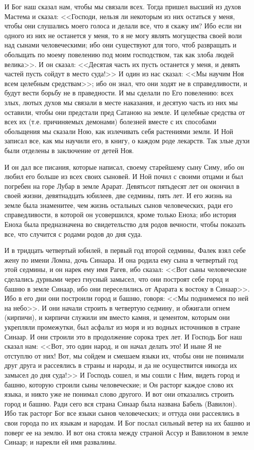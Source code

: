 И Бог наш сказал нам, чтобы мы связали всех.
Тогда пришел высший из духов Мастема и сказал:
<<Господи, нельзя ли некоторым из них остаться у
меня, чтобы они слушались моего голоса и делали
все, что я скажу им? Ибо если ни одного из них не
останется у меня, то я не могу являть могущества
своей воли над сынами человеческими; ибо они
существуют для того, чтоб развращать и обольщать
по моему повелению под моим господством, так как
злоба людей велика>>. И он сказал: <<Десятая
часть их пусть останется у меня, и девять частей
пусть сойдут в место суда!>> И один из нас
сказал: <<Мы научим Ноя всем целебным
средствам>>; ибо он знал, что они ходят не в
справедливости, и будут вести борьбу не в
праведности. И мы сделали по Его повелению: всех
злых, лютых духов мы связали в месте
наказания, и десятую часть из них мы оставили,
чтобы они предстали пред Сатаною на земле. И
целебные средства от всех их (т.е. причиняемых
демонами) болезней вместе с их способами
обольщения мы сказали Ною, как излечивать себя
растениями земли. И Ной записал все, как мы
научили его, в книгу, о каждом роде лекарств. Так
злые духи были отделены в заключение от детей
Ноя.

И он дал все писания, которые написал, своему
старейшему сыну Симу, ибо он любил его больше из
всех своих сыновей. И Ной почил с своими отцами и
был погребен на горе Лубар в земле Арарат.
Девятьсот пятьдесят лет он окончил в своей жизни,
девятнадцать юбилеев, две седмины, пять лет. И его
жизнь на земле была знаменитее, чем жизнь остальных сынов человеческих,
ради его справедливости, в которой он усовершился, кроме только Еноха; ибо
история Еноха была предназначена во свидетельство для родов вечности, чтобы
показать все, что случится с родами родов до дня суда.

И в тридцать четвертый юбилей, в первый год
второй седмины, Фалек взял себе жену по имени
Ломна, дочь Синаара. И она родила ему сына в
четвертый год этой седмины, и он нарек ему имя
Рагев, ибо сказал: <<Вот сыны человеческие
сделались дурными через гнусный замысел, что они
построят себе город и башню в земле Синаар, ибо
они переселились от Арарата к востоку в
Синаар>>. Ибо в его дни они построили город и
башню, говоря: <<Мы поднимемся по ней на небо>>.
И они начали строить в четвертую седмину, и
обжигали огнем (кирпичи), и кирпичи служили им
вместо камня, и цементом, которым они укрепляли
промежутки, был асфальт из моря и из водных
источников в стране Синаар. И они строили это в
продолжение сорока трех лет. И Господь Бог наш
сказал нам: <<Вот, это один народ, и он начал
делать это! И ныне Я не отступлю от них! Вот, мы
сойдем и смешаем языки их, чтобы они не понимали
друг друга и рассеялись в страны и народы, и да не
осуществится никогда их замысел до дня суда!>> И
Господь сошел, и мы сошли с Ним, видеть город и
башню, которую строили сыны человеческие; и Он
расторг каждое слово их языка, и никто уже не
понимал слово другого. И вот они отказались
строить город и башню. Ради сего вся страна
Синаар была названа Бабель (Вавилон). Ибо так
расторг Бог все языки сынов человеческих; и
оттуда они рассеялись в свои города по их языкам
и народам. И Бог послал сильный ветер на их башню
и поверг ее на землю. И вот она стояла между
страной Ассур и Вавилоном в земле Синаар; и
нарекли ей имя развалины.

